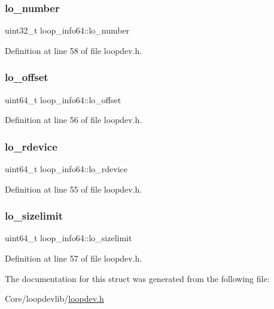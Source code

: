 \subsubsection{\texorpdfstring{lo\+\_\+number}{lo\_number}}
{\footnotesize\ttfamily uint32\+\_\+t loop\+\_\+info64\+::lo\+\_\+number}



Definition at line 58 of file loopdev.\+h.

\mbox{\label{structloop__info64_acbe88b7d8532c1474fd28ce7f4578341}} 
\subsubsection{\texorpdfstring{lo\+\_\+offset}{lo\_offset}}
{\footnotesize\ttfamily uint64\+\_\+t loop\+\_\+info64\+::lo\+\_\+offset}



Definition at line 56 of file loopdev.\+h.

\mbox{\label{structloop__info64_acf9b8410370967aceef642e07cf5d649}} 
\subsubsection{\texorpdfstring{lo\+\_\+rdevice}{lo\_rdevice}}
{\footnotesize\ttfamily uint64\+\_\+t loop\+\_\+info64\+::lo\+\_\+rdevice}



Definition at line 55 of file loopdev.\+h.

\mbox{\label{structloop__info64_a76c586564a87c69df033701afa1723ce}} 
\subsubsection{\texorpdfstring{lo\+\_\+sizelimit}{lo\_sizelimit}}
{\footnotesize\ttfamily uint64\+\_\+t loop\+\_\+info64\+::lo\+\_\+sizelimit}



Definition at line 57 of file loopdev.\+h.



The documentation for this struct was generated from the following file\+:\begin{DoxyCompactItemize}
\item 
Core/loopdevlib/\hyperlink{loopdev_8h}{loopdev.\+h}\end{DoxyCompactItemize}
